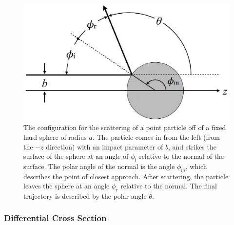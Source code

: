 \documentclass[12pt,a4paper]{article}
\begin{document}
\begin{figure}
\centering
\includegraphics[height=6.cm, angle=0]{hard_sphere.eps}
\caption{The configuration for the scattering of a point particle off of a fixed hard sphere of radius $a$. The particle comes in from the left (from the $-z$ direction) with an impact parameter of $b$, and strikes the surface of the sphere at an angle of $\phi_i$ relative to the normal of the surface. The polar angle of the normal is the angle $\phi_m$, which describes the point of closest approach. After scattering, the particle leaves the sphere at an angle $\phi_r$ relative to the normal. The final trajectory is described by the polar angle $\theta$.
}
\label{fig:hard_sphere}
\end{figure}


\subsubsection{Differential Cross Section}
\cite{benacquista2018classical} 
\end{document}

